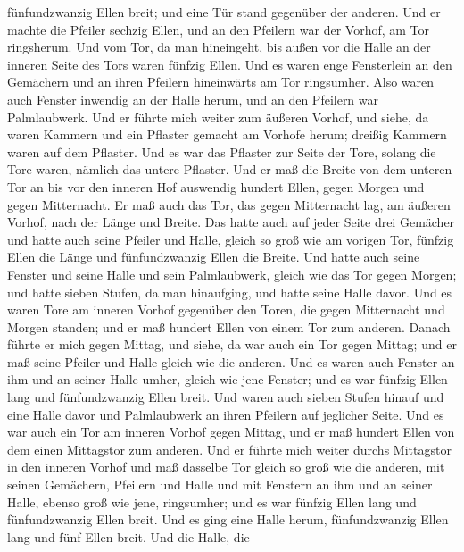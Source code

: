 fünfundzwanzig Ellen breit; und eine Tür stand gegenüber der anderen.
 Und er machte die Pfeiler sechzig Ellen, und an den
Pfeilern war der Vorhof, am Tor ringsherum.  Und vom Tor,
da man hineingeht, bis außen vor die Halle an der inneren Seite des Tors
waren fünfzig Ellen.  Und es waren enge Fensterlein an
den Gemächern und an ihren Pfeilern hineinwärts am Tor ringsumher. Also
waren auch Fenster inwendig an der Halle herum, und an den Pfeilern war
Palmlaubwerk.  Und er führte mich weiter zum äußeren
Vorhof, und siehe, da waren Kammern und ein Pflaster gemacht am Vorhofe
herum; dreißig Kammern waren auf dem Pflaster.  Und es
war das Pflaster zur Seite der Tore, solang die Tore waren, nämlich das
untere Pflaster.  Und er maß die Breite von dem unteren
Tor an bis vor den inneren Hof auswendig hundert Ellen, gegen Morgen und
gegen Mitternacht.  Er maß auch das Tor, das gegen
Mitternacht lag, am äußeren Vorhof, nach der Länge und Breite.
 Das hatte auch auf jeder Seite drei Gemächer und hatte
auch seine Pfeiler und Halle, gleich so groß wie am vorigen Tor, fünfzig
Ellen die Länge und fünfundzwanzig Ellen die Breite.  Und
hatte auch seine Fenster und seine Halle und sein Palmlaubwerk, gleich
wie das Tor gegen Morgen; und hatte sieben Stufen, da man hinaufging,
und hatte seine Halle davor.  Und es waren Tore am
inneren Vorhof gegenüber den Toren, die gegen Mitternacht und Morgen
standen; und er maß hundert Ellen von einem Tor zum anderen.
 Danach führte er mich gegen Mittag, und siehe, da war
auch ein Tor gegen Mittag; und er maß seine Pfeiler und Halle gleich wie
die anderen.  Und es waren auch Fenster an ihm und an
seiner Halle umher, gleich wie jene Fenster; und es war fünfzig Ellen
lang und fünfundzwanzig Ellen breit.  Und waren auch
sieben Stufen hinauf und eine Halle davor und Palmlaubwerk an ihren
Pfeilern auf jeglicher Seite.  Und es war auch ein Tor am
inneren Vorhof gegen Mittag, und er maß hundert Ellen von dem einen
Mittagstor zum anderen.  Und er führte mich weiter durchs
Mittagstor in den inneren Vorhof und maß dasselbe Tor gleich so groß wie
die anderen,  mit seinen Gemächern, Pfeilern und Halle
und mit Fenstern an ihm und an seiner Halle, ebenso groß wie jene,
ringsumher; und es war fünfzig Ellen lang und fünfundzwanzig Ellen
breit.  Und es ging eine Halle herum, fünfundzwanzig
Ellen lang und fünf Ellen breit.  Und die Halle, die
